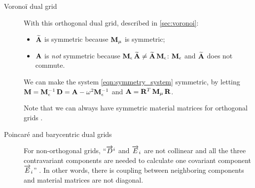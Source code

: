 \begin{description}
\item[Vorono\"i dual grid]
  With this orthogonal dual grid, described in \ref{sec:voronoi}:
  \begin{itemize}
  \item
    $\widetilde{\mathbf{A}}$ is symmetric because $\mathbf{M}_\mu$ is symmetric;
  \item
    $\mathbf{A}$ is \emph{not} symmetric because ${\mathbf{M}_\epsilon\,\widetilde{\mathbf{A}}} \neq
    {\widetilde{\mathbf{A}}\,\mathbf{M}_\epsilon}$:
    $\mathbf{M}_\epsilon$ and $\widetilde{\mathbf{A}}$ does not commute.
  \end{itemize}
  
  We can make the system \ref{eqn:symmetry_system} symmetric, by
  letting $\mathbf{M} = {\mathbf{M}_\epsilon^{-1}\,\mathbf{D}} =
  \mathbf{A} - \omega^2 \mathbf{M}_\epsilon^{-1}$ and $\mathbf{A} =
  {{{\mathbf{R}}^T\,\mathbf{M}_\mu}\,\mathbf{R}}$.
  
  Note that we can always have symmetric material matrices for
  orthogonal grids \cite{schuhmann_stability}.
  
\item[Poincar\'e and barycentric dual grids]
  For non-orthogonal grids, ``$\overrightarrow{D}^i$ and $\overrightarrow{E}_i$ are
  not collinear and all the three contravariant components are needed
  to calculate one covariant component $\overrightarrow{E}_i$''
  \cite{schuhmann_stability}. In other words, there is coupling
  between neighboring components and material matrices are not diagonal.
  

\end{description}
